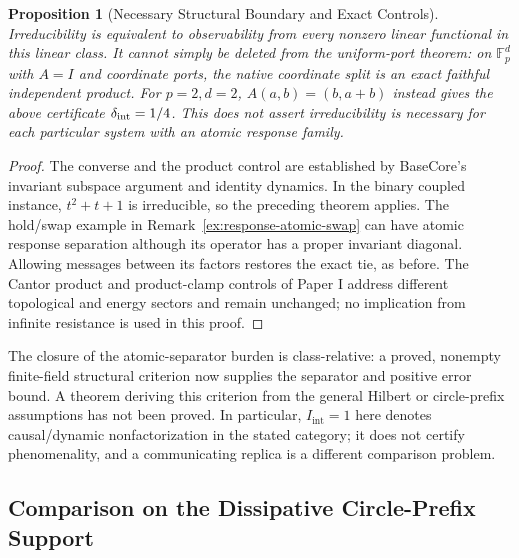 \documentclass[11pt,a4paper]{article}
\newtheorem{proposition}[theorem]{Proposition}
\theoremstyle{definition}
\newcommand{\Iint}{I_{\mathrm{int}}}
\begin{document}
\begin{proposition}[Necessary Structural Boundary and Exact Controls]
\label{prop:iint-irreducible-negatives}
Irreducibility is equivalent to observability from every nonzero linear
functional in this linear class. It cannot simply be deleted from the
uniform-port theorem: on $\mathbb F_p^d$ with $A=I$ and coordinate ports,
the native coordinate split is an exact faithful independent product.
For $p=2,d=2$, $A(a,b)=(b,a+b)$ instead gives the above certificate
$\delta_{\rm int}=1/4$. This does not assert irreducibility is necessary
for each particular system with an atomic response family.
\end{proposition}
\begin{proof}
The converse and the product control are established by BaseCore's invariant
subspace argument and identity dynamics. In the binary coupled instance,
$t^2+t+1$ is irreducible, so the preceding theorem applies. The hold/swap
example in Remark~\ref{ex:response-atomic-swap} can have atomic response
separation although its operator has a proper invariant diagonal. Allowing
messages between its factors restores the exact tie, as before. The Cantor
product and product-clamp controls of Paper I address different topological
and energy sectors and remain unchanged; no implication from infinite
resistance is used in this proof.
\end{proof}

The closure of the atomic-separator burden is class-relative: a proved,
nonempty finite-field structural criterion now supplies the separator and
positive error bound. A theorem deriving this criterion from the general
Hilbert or circle-prefix assumptions has not been proved. In particular,
$\Iint=1$ here denotes causal/dynamic nonfactorization in the stated category;
it does not certify phenomenality, and a communicating replica is a different
comparison problem.

\subsection{Comparison on the Dissipative Circle-Prefix Support}
\end{document}
